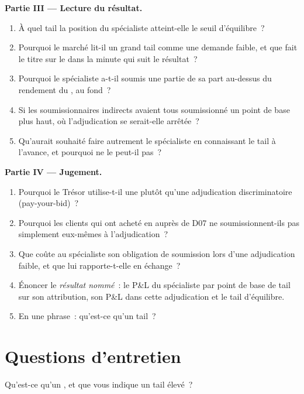 \begin{problem}
\medskip\noindent\textbf{Partie III --- Lecture du résultat.}
\begin{enumerate}[resume]
\item À quel tail la position du spécialiste atteint-elle le seuil d'équilibre~?
\item Pourquoi le marché lit-il un grand tail comme une demande faible, et que fait le
titre sur le  dans la minute qui suit le résultat~?
\item Pourquoi le spécialiste a-t-il soumis une partie de sa part au-dessus du rendement du
, au fond~?
\item Si les soumissionnaires indirects avaient tous soumissionné un point de base plus haut, où
l'adjudication se serait-elle arrêtée~?
\item Qu'aurait souhaité faire autrement le spécialiste en connaissant le tail à l'avance, et
pourquoi ne le peut-il pas~?
\end{enumerate}

\medskip\noindent\textbf{Partie IV --- Jugement.}
\begin{enumerate}[resume]
\item Pourquoi le Trésor utilise-t-il une  plutôt qu'une
adjudication discriminatoire (pay-your-bid)~?
\item Pourquoi les clients qui ont acheté en  auprès de D07 ne soumissionnent-ils pas
simplement eux-mêmes à l'adjudication~?
\item Que coûte au spécialiste son obligation de soumission lors d'une adjudication faible,
et que lui rapporte-t-elle en échange~?
\item Énoncer le \emph{résultat nommé}~: le P\&L du spécialiste par point de base de tail sur
son attribution, son P\&L dans cette adjudication et le tail d'équilibre.
\item En une phrase~: qu'est-ce qu'un tail~?
\end{enumerate}
\end{problem}

\section{Questions d'entretien}

\begin{interviewq}\label{iq:m2:the-treasury-market:1}
Qu'est-ce qu'un , et que vous indique un tail élevé~?
\end{interviewq}


